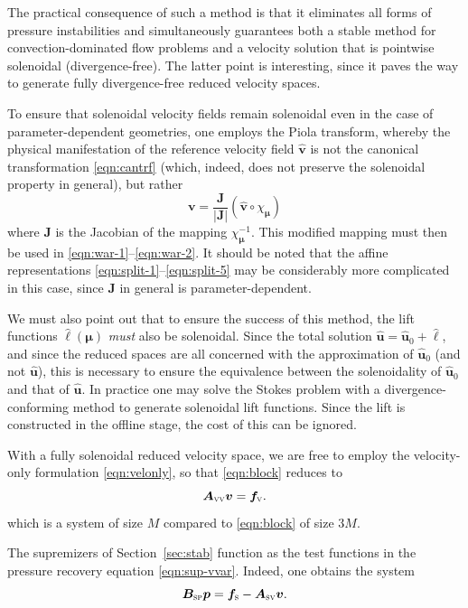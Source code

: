 \documentclass[onecolumn, twoside, a4paper, 11pt]{article}
\begin{document}
The practical consequence of such a method is that it eliminates all forms of
pressure instabilities and simultaneously guarantees both a stable method for
convection-dominated flow problems and a velocity solution that is pointwise
solenoidal (divergence-free). The latter point is interesting, since it paves
the way to generate fully divergence-free reduced velocity spaces.

To ensure that solenoidal velocity fields remain solenoidal even in the case of
parameter-dependent geometries, one employs the Piola transform, whereby the
physical manifestation of the reference velocity field $\hat{\bm v}$ is not the
canonical transformation \eqref{eqn:cantrf} (which, indeed, does not
preserve the solenoidal property in general), but rather
\begin{equation}
  \label{eqn:piola}
  \bm v = \frac{\bm J}{|\bm J|} (\hat{\bm v} \circ \chi_{\bm\mu})
\end{equation}
where $\bm J$ is the Jacobian of the mapping $\chi_{\bm \mu}^{-1}$. This modified
mapping must then be used in \eqref{eqn:war-1}--\eqref{eqn:war-2}. It should be
noted that the affine representations \eqref{eqn:split-1}--\eqref{eqn:split-5}
may be considerably more complicated in this case, since $\bm J$ in general is
parameter-dependent.

We must also point out that to ensure the success of this method, the lift
functions $\hat{\bm \ell}(\bm \mu)$ \emph{must} also be solenoidal. Since the total
solution $\hat{\bm u} = \hat{\bm u}_0 + \hat{\bm \ell}$, and since the reduced spaces are all
concerned with the approximation of $\hat{\bm u}_0$ (and not $\hat{\bm u}$), this is
necessary to ensure the equivalence between the solenoidality of $\hat{\bm u}_0$ and
that of $\hat{\bm u}$. In practice one may solve the Stokes problem with a
divergence-conforming method to generate solenoidal lift functions. Since the lift is constructed in
the offline stage, the cost of this can be ignored.

With a fully solenoidal reduced velocity space, we are free to employ the
velocity-only formulation \eqref{eqn:velonly}, so that \eqref{eqn:block} reduces
to
\begin{equation}
  \bm A_\textsc{vv} \bm v = \bm f_\textsc{v}.
  \label{eqn:blocksolve-1}
\end{equation}
which is a system of size $M$ compared to \eqref{eqn:block} of size $3M$.

The supremizers of Section~\ref{sec:stab} function as the test functions in the
pressure recovery equation \eqref{eqn:sup-vvar}. Indeed, one obtains the system
\begin{equation}
  \bm B_\textsc{sp} \bm p = \bm f_\textsc{s} - \bm A_\textsc{sv} \bm v.
  \label{eqn:blocksolve-2}
\end{equation}
\end{document}

